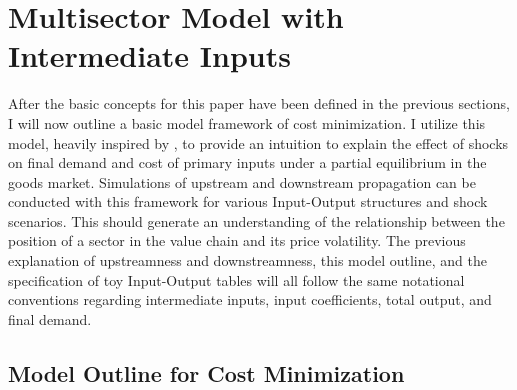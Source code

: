 \section{Multisector Model with Intermediate Inputs}
\label{sec:model}

After the basic concepts for this paper have been defined in the previous sections, I will now outline a basic model framework of cost 
minimization. I utilize this model, heavily inspired by \textcite{caliendo2015EstimatesTradeWelfare}, to provide an intuition to explain 
the effect of shocks on final demand and cost of primary inputs under a partial equilibrium in the goods market. Simulations of upstream 
and downstream propagation can be conducted with this framework for various Input-Output structures and shock scenarios. This should 
generate an understanding of the relationship between the position of a sector in the value chain and its price volatility. The previous 
explanation of upstreamness and downstreamness, this model outline, and the specification of toy Input-Output tables will all follow the 
same notational conventions regarding intermediate inputs, input coefficients, total output, and final demand. 

\subsection{Model Outline for Cost Minimization}

